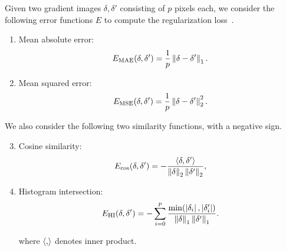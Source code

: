 Given two gradient images $\delta, \delta'$ consisting of $p$ pixels each, we consider the following error functions $E$ to compute the regularization loss~.




\begin{enumerate}[itemsep=2pt, parsep=0pt, topsep=3pt]

 	\item Mean absolute error:
 	\begin{equation}
 		E_{\textrm{MAE}}(\delta, \delta') = \frac{1}{p} \left\|{\delta - \delta'}\right\|_1.
 	\label{eq:mae}
\end{equation}
 	\item Mean squared error:
 	\begin{equation}
 		E_{\textrm{MSE}}(\delta, \delta') = \frac{1}{p} \left\|{\delta - \delta'}\right\|_2^2.
 	\label{eq:mse}
 	\end{equation}

\end{enumerate}

We also consider the following two similarity functions, with a negative sign.
\begin{enumerate}[itemsep=2pt, parsep=0pt, topsep=3pt]
	\setcounter{enumi}{2}
	\item Cosine similarity:
	\begin{equation}
		E_{\cos}(\delta, \delta') = -\frac{\left\langle{\delta, \delta'}\right\rangle}{\left\|{\delta}\right\|_2 \left\|{\delta'}\right\|_2},
	\label{eq:cos}
	\end{equation}
 
	\item Histogram intersection:
	\begin{equation}
		E_{\textrm{HI}}(\delta, \delta') = -\sum_{i=0}^p 
			\frac{\min(\left|{\delta_i}\right|, \left|{\delta'_i}\right|)}{\left\|{\delta}\right\|_1 \left\|{\delta'}\right\|_1}.
	\label{eq:hi}
	\end{equation}

	where $\left\langle{,}\right\rangle$ denotes inner product.

\end{enumerate}

